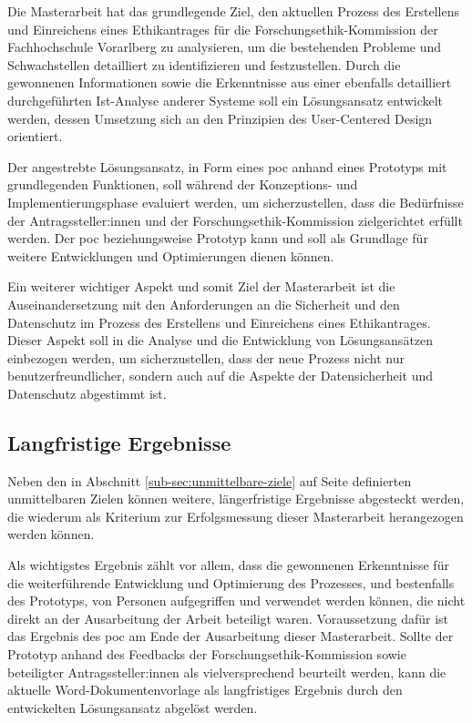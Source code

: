\documentclass[a4paper,12pt,twoside]{scrreprt}
\begin{document}
Die Masterarbeit hat das grundlegende Ziel, den aktuellen Prozess des Erstellens und Einreichens eines Ethikantrages für die Forschungsethik-Kommission der Fachhochschule Vorarlberg zu analysieren, um die bestehenden Probleme und Schwachstellen detailliert zu identifizieren und festzustellen. Durch die gewonnenen Informationen sowie die Erkenntnisse aus einer ebenfalls detailliert durchgeführten Ist-Analyse anderer Systeme soll ein Lösungsansatz entwickelt werden, dessen Umsetzung sich an den Prinzipien des User-Centered Design orientiert.

Der angestrebte Lösungsansatz, in Form eines \ac{poc} anhand eines Prototyps mit grundlegenden Funktionen, soll während der Konzeptions- und Implementierungsphase evaluiert werden, um sicherzustellen, dass die Bedürfnisse der Antragssteller:innen und der Forschungsethik-Kommission zielgerichtet erfüllt werden. Der \ac{poc} beziehungsweise Prototyp kann und soll als Grundlage für weitere Entwicklungen und Optimierungen dienen können.

Ein weiterer wichtiger Aspekt und somit Ziel der Masterarbeit ist die Auseinandersetzung mit den Anforderungen an die Sicherheit und den Datenschutz im Prozess des Erstellens und Einreichens eines Ethikantrages. Dieser Aspekt soll in die Analyse und die Entwicklung von Lösungsansätzen einbezogen werden, um sicherzustellen, dass der neue Prozess nicht nur benutzerfreundlicher, sondern auch auf die Aspekte der Datensicherheit und Datenschutz abgestimmt ist.

\subsection{Langfristige Ergebnisse}
\label{sub-sec:langfristige-ergebnisse}

Neben den in Abschnitt \ref{sub-sec:unmittelbare-ziele} auf Seite \pageref{sub-sec:unmittelbare-ziele} definierten unmittelbaren Zielen können weitere, längerfristige Ergebnisse abgesteckt werden, die wiederum als Kriterium zur Erfolgsmessung dieser Masterarbeit herangezogen werden können.

Als wichtigstes Ergebnis zählt vor allem, dass die gewonnenen Erkenntnisse für die weiterführende Entwicklung und Optimierung des Prozesses, und bestenfalls des Prototyps, von Personen aufgegriffen und verwendet werden können, die nicht direkt an der Ausarbeitung der Arbeit beteiligt waren. Voraussetzung dafür ist das Ergebnis des \ac{poc} am Ende der Ausarbeitung dieser Masterarbeit. Sollte der Prototyp anhand des Feedbacks der Forschungsethik-Kommission sowie beteiligter Antragssteller:innen als vielversprechend beurteilt werden, kann die aktuelle Word-Dokumentenvorlage als langfristiges Ergebnis durch den entwickelten Lösungsansatz abgelöst werden.
\end{document}
